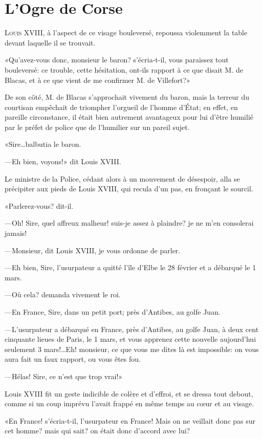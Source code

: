 \chapter{L'Ogre de Corse}

\lettrine{L}{ouis} XVIII, à l'aspect de ce visage bouleversé, repoussa violemment la table devant laquelle il se trouvait.

\zz
«Qu'avez-vous donc, monsieur le baron? s'écria-t-il, vous paraissez tout bouleversé: ce trouble, cette hésitation, ont-ils rapport à ce que disait M. de Blacas, et à ce que vient de me confirmer M. de Villefort?»


De son côté, M. de Blacas s'approchait vivement du baron, mais la terreur du courtisan empêchait de triompher l'orgueil de l'homme d'État; en effet, en pareille circonstance, il était bien autrement avantageux pour lui d'être humilié par le préfet de police que de l'humilier sur un pareil sujet.

«Sire\dots balbutia le baron.

—Eh bien, voyons!» dit Louis XVIII.

Le ministre de la Police, cédant alors à un mouvement de désespoir, alla se précipiter aux pieds de Louis XVIII, qui recula d'un pas, en fronçant le sourcil.

«Parlerez-vous? dit-il.

—Oh! Sire, quel affreux malheur! suis-je assez à plaindre? je ne m'en consolerai jamais!

—Monsieur, dit Louis XVIII, je vous ordonne de parler.

—Eh bien, Sire, l'usurpateur a quitté l'île d'Elbe le 28 février et a débarqué le 1\ier{} mars.

—Où cela? demanda vivement le roi.

—En France, Sire, dans un petit port; près d'Antibes, au golfe Juan.

—L'usurpateur a débarqué en France, près d'Antibes, au golfe Juan, à deux cent cinquante lieues de Paris, le 1\ier{} mars, et vous apprenez cette nouvelle aujourd'hui seulement 3 mars!\dots Eh! monsieur, ce que vous me dites là est impossible: on vous aura fait un faux rapport, ou vous êtes fou.

—Hélas! Sire, ce n'est que trop vrai!»

Louis XVIII fit un geste indicible de colère et d'effroi, et se dressa tout debout, comme si un coup imprévu l'avait frappé en même temps au cœur et au visage.

«En France! s'écria-t-il, l'usurpateur en France! Mais on ne veillait donc pas sur cet homme? mais qui sait? on était donc d'accord avec lui?

